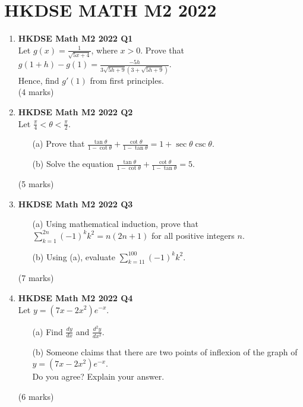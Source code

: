 \documentclass{report}
\begin{document}
\chapter{HKDSE MATH M2 2022}
\begin{enumerate}
	\item \textbf{HKDSE Math M2 2022 Q1}\\
	Let $\displaystyle g(x) = \frac{1}{\sqrt{5x+4}}$, where $x > 0$. Prove that $\displaystyle g(1+h)-g(1) = \frac{-5h}{3\sqrt{5h+9}(3+\sqrt{5h+9})}$. \\
	Hence, find $g'(1)$ from first principles. \\
	(4 marks)

	\item \textbf{HKDSE Math M2 2022 Q2}\\
	Let $\displaystyle \frac{\pi}{4} < \theta < \frac{\pi}{2}$.
	\begin{enumerate}
		\item [(a)] Prove that $\displaystyle \frac{\tan{\theta}}{1-\cot{\theta}} + \frac{\cot{\theta}}{1-\tan{\theta}} = 1+\sec{\theta}\csc{\theta}$.
		\item [(b)] Solve the equation $\displaystyle \frac{\tan{\theta}}{1-\cot{\theta}} + \frac{\cot{\theta}}{1-\tan{\theta}} = 5$.
	\end{enumerate}
	(5 marks)

	\item \textbf{HKDSE Math M2 2022 Q3}
	\begin{enumerate}
		\item [(a)]Using mathematical induction, prove that $\displaystyle \sum_{k = 1}^{2n} (-1)^k k^2 = n(2n+1)$ for all positive integers $n$.
		\item [(b)] Using (a), evaluate $\displaystyle \sum_{k = 11}^{100} (-1)^k k^2$. 
	\end{enumerate}
	(7 marks)

	\item \textbf{HKDSE Math M2 2022 Q4}\\
	Let $y = (7x - 2x^2)e^{-x}$.
	\begin{enumerate}
		\item[(a)]
		Find $\displaystyle \frac{dy}{dx}$ and $\displaystyle \frac{d^2y}{dx^2}$. 
		\item[(b)]
		Someone claims that there are two points of inflexion of the graph of $y = (7x - 2x^2)e^{-x}$. \\
		Do you agree? Explain your answer. 
	\end{enumerate}
	(6 marks)


\end{enumerate}
\end{document}
